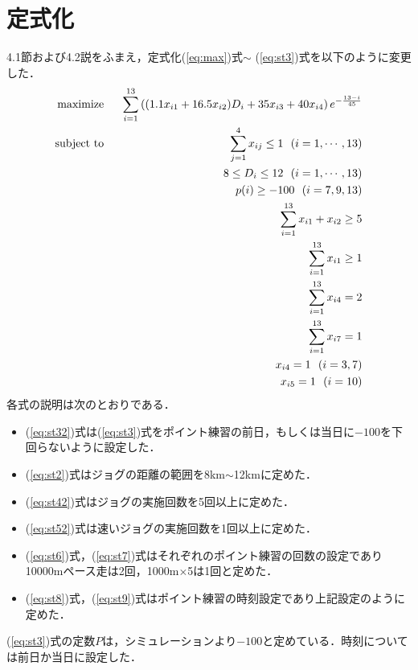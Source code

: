 \documentclass[12pt,fleqn]{jreport}
\begin{document}
\section{定式化}
4.1節および4.2説をふまえ，定式化(\ref{eq:max})式$\sim$ (\ref{eq:st3})式を以下のように変更した．
\newpage
\begin{eqnarray}
  \mathop{\rm maximize}&\ \ &\sum_{i=1}^{13} \left((1.1x_{i1}+16.5x_{i2})D_{i}+35x_{i3}+40x_{i4}\right)e^{-\frac{13-i}{45}}\label{eq:max1}\\%
  \mathop{\rm subject\ to}&\ \ &\sum_{j=1}^4 x_{ij}\leq 1\ \ (i=1,\cdots,13)\label{eq:st12}\\%
  &&8\leq D_{i} \leq 12\ \ (i=1,\cdots,13) \label{eq:st2}\\%
  &&p(i)\geq -100\ \ (i=7,9,13)\label{eq:st32}\\%
  &&\sum_{i=1}^{13} x_{i1}+x_{i2}\geq 5\label{eq:st42}\\%
  &&\sum_{i=1}^{13} x_{i1}\geq 1\label{eq:st52}\\%
  &&\sum_{i=1}^{13} x_{i4}=2\label{eq:st6}\\%
  &&\sum_{i=1}^{13} x_{i7}=1\label{eq:st7}\\%
  &&x_{i4}=1\ \ (i=3,7)\label{eq:st8}\\%
  &&x_{i5}=1\ \ (i=10)\label{eq:st9}%
\end{eqnarray}
\newpage
各式の説明は次のとおりである．
\begin{itemize}
  \item (\ref{eq:st32})式は(\ref{eq:st3})式をポイント練習の前日，もしくは当日に$-100$を下回らないように設定した．
  \item (\ref{eq:st2})式はジョグの距離の範囲を8km$\sim$12kmに定めた．
  \item (\ref{eq:st42})式はジョグの実施回数を5回以上に定めた．
  \item (\ref{eq:st52})式は速いジョグの実施回数を1回以上に定めた．
  \item (\ref{eq:st6})式，(\ref{eq:st7})式はそれぞれのポイント練習の回数の設定であり10000mペース走は2回，1000m$\times$5は1回と定めた．
  \item (\ref{eq:st8})式，(\ref{eq:st9})式はポイント練習の時刻設定であり上記設定のように定めた．
\end{itemize}
\vspace{1cm}
(\ref{eq:st3})式の定数$P$は，シミュレーションより$-100$と定めている．時刻については前日か当日に設定した．
\end{document}
